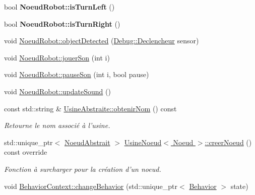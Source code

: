 \begin{DoxyCompactItemize}
\item 
\hypertarget{group__inf2990_ga49f65d4d32c9abd0da2576c07bae97e4}{bool {\bfseries Noeud\-Robot\-::is\-Turn\-Left} ()}\label{group__inf2990_ga49f65d4d32c9abd0da2576c07bae97e4}

\item 
\hypertarget{group__inf2990_ga2a9dbfd2c32f254b20c81ae3f006be31}{bool {\bfseries Noeud\-Robot\-::is\-Turn\-Right} ()}\label{group__inf2990_ga2a9dbfd2c32f254b20c81ae3f006be31}

\item 
void \hyperlink{group__inf2990_ga3fdf900e74c2634f92abcb164f6ac96a}{Noeud\-Robot\-::object\-Detected} (\hyperlink{class_debug_afd6ed3c50c08d0a7830cd5253b4ab8b6}{Debug\-::\-Declencheur} sensor)
\item 
void \hyperlink{group__inf2990_gac14ff240c783bbdda3250fe289ff7ad0}{Noeud\-Robot\-::jouer\-Son} (int i)
\item 
void \hyperlink{group__inf2990_gaba7e52b38301ae8426747b934c593b62}{Noeud\-Robot\-::pause\-Son} (int i, bool pause)
\item 
void \hyperlink{group__inf2990_ga4456b762c2417a10769d41597ff738db}{Noeud\-Robot\-::update\-Sound} ()
\item 
\hypertarget{group__inf2990_gad39877ea31a37efc3e58708193155c3c}{const std\-::string \& \hyperlink{group__inf2990_gad39877ea31a37efc3e58708193155c3c}{Usine\-Abstraite\-::obtenir\-Nom} () const }\label{group__inf2990_gad39877ea31a37efc3e58708193155c3c}

\begin{DoxyCompactList}\small\item\em Retourne le nom associé à l'usine. \end{DoxyCompactList}\item 
std\-::unique\-\_\-ptr$<$ \hyperlink{class_noeud_abstrait}{Noeud\-Abstrait} $>$ \hyperlink{group__inf2990_gaefabfaab4efcf2d2e910cff0246d4735}{Usine\-Noeud$<$ Noeud $>$\-::creer\-Noeud} () const override
\begin{DoxyCompactList}\small\item\em Fonction à surcharger pour la création d'un noeud. \end{DoxyCompactList}\item 
\hypertarget{group__inf2990_gab48b5ca95ff1064b51a159e41e68fbaf}{void \hyperlink{group__inf2990_gab48b5ca95ff1064b51a159e41e68fbaf}{Behavior\-Context\-::change\-Behavior} (std\-::unique\-\_\-ptr$<$ \hyperlink{class_behavior}{Behavior} $>$ state)}\label{group__inf2990_gab48b5ca95ff1064b51a159e41e68fbaf}


\end{DoxyCompactItemize}

